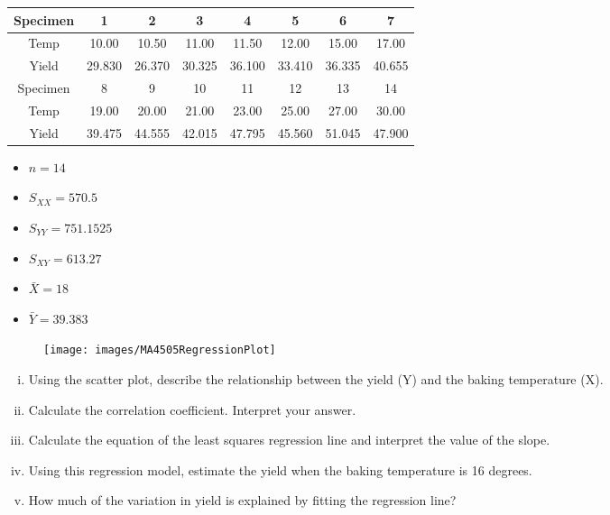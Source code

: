 \documentclass[a4paper,12pt]{article}
\begin{document}
\begin{enumerate}
\begin{center}
	\begin{tabular}{|c||c|c|c|c|c|c|c|}
		\hline
		Specimen & 1 & 2 & 3 & 4 & 5 & 6 & 7 \\ \hline
		\hline
		Temp &  10.00 & 10.50 & 11.00 & 11.50 & 12.00 & 15.00 & 17.00 \\ \hline 
		Yield &  29.830&  26.370 & 30.325 &36.100 &33.410 &36.335 & 40.655 \\ \hline 
		\hline\hline
		Specimen & 8 & 9 & 10 & 11 & 12 & 13 & 14 \\  \hline
		Temp &  19.00 & 20.00 & 21.00 & 23.00 & 25.00 & 27.00 & 30.00 \\ \hline
		Yield &  39.475& 44.555&  42.015 & 47.795 & 45.560&  51.045 & 47.900 \\ \hline 
		\hline
	\end{tabular}
\end{center}

\begin{multicols}{3}
	\begin{itemize}
		\item $n=14$
		\item $S_{XX} = 570.5$
		\item $S_{YY} =  751.1525$
		\item $S_{XY} = 613.27$
		\item $\bar{X} = 18$
		\item $\bar{Y} = 39.383$
	\end{itemize}
\end{multicols}


\begin{figure}
	\centering
	\texttt{[image: images/MA4505RegressionPlot]}
\end{figure}
\medskip
\begin{enumerate}[(i)]
	\item  Using the scatter plot, describe the relationship between the yield (Y) and the baking temperature (X).
	\item  Calculate the correlation coefficient. Interpret your answer.
	\item  Calculate the equation of the least squares regression line and interpret the value of the slope.
	\item  Using this regression model, estimate the yield when the baking temperature is 16 degrees.
	\item  How much of the variation in yield is explained by fitting the regression line?
\end{enumerate}



%



\end{enumerate}
\end{document}
